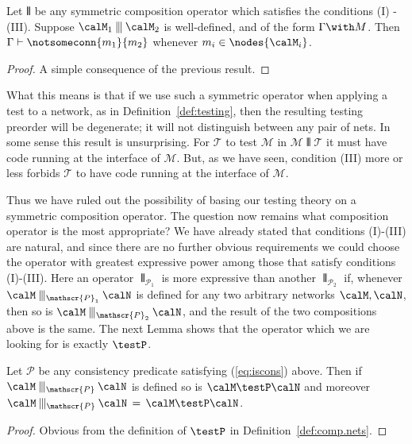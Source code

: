 \documentclass{LMCS}
\begin{document}
\begin{cor}
Let $\interleave$ be any 
symmetric composition operator which satisfies the conditions (I) - (III). 
Suppose $ \calM_1 \interleave \calM_2$ is well-defined, and of the form 
$\Gamma \with M$. Then $\Gamma \vdash \notsomeconn{m_1}{m_2}$ whenever $m_i \in 
\nodes{\calM_i}$. 
\end{cor}
\begin{proof}
  A simple consequence of the previous result.
\end{proof}
\noindent
What this means is that if we use such a symmetric operator when applying a test to
a network, as in Definition~\ref{def:testing}, then the resulting testing preorder will
be degenerate; it will not distinguish between any pair of nets. 
In some sense this result is unsurprising. For $\mathcal T$ to test $\mathcal
M$ in ${\mathcal M}\interleave {\mathcal T}$ it must have code running at the
interface of $\mathcal M$. But, as we have seen, condition (III) more or less forbids $\mathcal
T$ to have code running at the interface of $\mathcal M$.

Thus we have ruled out the possibility of basing our testing theory on a symmetric 
composition operator. The question now remains what composition operator is the most appropriate? 
We have already stated that conditions (I)-(III) are natural, 
and since there are no further obvious requirements we
could choose  the operator with greatest expressive power among those that satisfy conditions (I)-(III). 
Here an operator $\interleave_{\mathscr{P}_1}$ is more expressive than another 
$\interleave_{\mathscr{P}_2}$ if, whenever $\calM \interleave_{\mathscr{P}_1} \calN$ is defined 
for any two arbitrary networks $\calM, \calN$, 
then so is $\calM \interleave_{\mathscr{P}_2} \calN$, and the result of the two compositions 
above is the same. 
The next Lemma shows that the operator which we are looking for is exactly $\testP$.
\begin{lem}
  Let $\mathscr{P}$ be any consistency predicate satisfying  (\ref{eq:iscons}) above. Then 
 if  $\calM  \interleave_{\mathscr{P}}  \calN $ is defined so is $\calM \testP \calN$ and 
 moreover $\calM  \interleave_{\mathscr{P}}  \calN \,=\,\calM \testP \calN$.  
\end{lem}
\begin{proof}
  Obvious from the definition of $\testP$ in Definition~\ref{def:comp.nets}. 
\end{proof}
\end{document}
